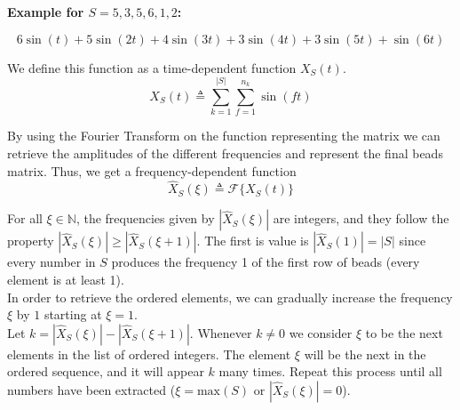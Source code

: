 \documentclass{article}
\begin{document}
\textbf{Example for \(S = 5,3,5,6,1,2\):}

\begin{minipage}{0.3\textwidth}
    \begin{flushright}        
    \end{flushright}
\end{minipage}
\begin{minipage}{0.5\textwidth}
    \[
        6\sin(t) + 5\sin(2t) + 4\sin(3t) + 3\sin(4t)+3\sin(5t)+\sin(6t)
    \]
\end{minipage}

We define this function as a time-dependent function \(X_S(t)\).
\[
    X_S(t) \triangleq
    \sum_{k=1}^{|S|}
    \sum_{f=1}^{n_k}
    \sin(ft)
\]

By using the Fourier Transform on the function representing the matrix
we can retrieve the amplitudes of the different frequencies
and represent the final beads matrix.
Thus, we get a frequency-dependent function
\[
    \hat{X}_S(\xi)
    \triangleq
    \mathcal{F}\{X_S(t)\}
\]

For all \(\xi \in \mathbb{N}\), the frequencies given by
\(|\hat{X}_S(\xi)|\) are integers, and they follow the property
\(|\hat{X}_S(\xi)| \geq |\hat{X}_S(\xi+1)|\).
The first is value is \(|\hat{X}_S(1)|=|S|\) since every number in \(S\) produces 
the frequency 1 of the first row of beads (every element is at least 1). \\
In order to retrieve the ordered elements, we can gradually increase
the frequency \(\xi\) by \(1\) starting at \(\xi=1\). \\
Let \(k=|\hat{X}_S(\xi)| - |\hat{X}_S(\xi+1)|\). Whenever \(k \neq 0\)
we consider \(\xi\) to be the next elements in the list of ordered
integers. The element \(\xi\) will be the next in the ordered sequence,
and it will appear \(k\) many times.
Repeat this process until all numbers have been extracted
(\(\xi = \text{max}(S)\) or \(|\hat{X}_S(\xi)|=0\)).
\end{document}
